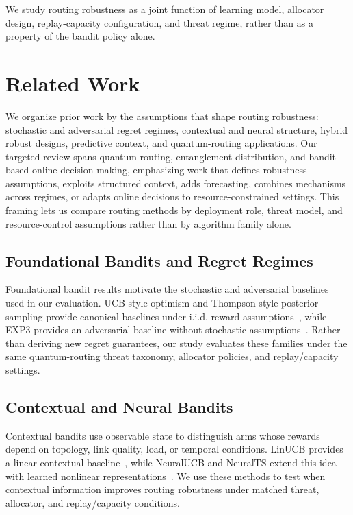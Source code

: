 \documentclass[10pt,conference]{IEEEtran}
\begin{document}
We study routing robustness as a joint function of learning model, allocator design, replay-capacity configuration, and threat regime, rather than as a property of the bandit policy alone.

\section{Related Work}
\label{sec:RelatedWork}

We organize prior work by the assumptions that shape routing robustness: stochastic and adversarial regret regimes, contextual and neural structure, hybrid robust designs, predictive context, and quantum-routing applications. Our targeted review spans quantum routing, entanglement distribution, and bandit-based online decision-making, emphasizing work that defines robustness assumptions, exploits structured context, adds forecasting, combines mechanisms across regimes, or adapts online decisions to resource-constrained settings. This framing lets us compare routing methods by deployment role, threat model, and resource-control assumptions rather than by algorithm family alone.

\subsection{Foundational Bandits and Regret Regimes}

Foundational bandit results motivate the stochastic and adversarial baselines used in our evaluation. UCB-style optimism and Thompson-style posterior sampling provide canonical baselines under i.i.d. reward assumptions~\cite{auer2002finite,thompson1933likelihood}, while EXP3 provides an adversarial baseline without stochastic assumptions~\cite{auer2002nonstochastic}. Rather than deriving new regret guarantees, our study evaluates these families under the same quantum-routing threat taxonomy, allocator policies, and replay/capacity settings.

\subsection{Contextual and Neural Bandits}

Contextual bandits use observable state to distinguish arms whose rewards depend on topology, link quality, load, or temporal conditions. LinUCB provides a linear contextual baseline~\cite{li2010contextual}, while NeuralUCB and NeuralTS extend this idea with learned nonlinear representations~\cite{zhou2020neuralucb,zhang2022neuralts}. We use these methods to test when contextual information improves routing robustness under matched threat, allocator, and replay/capacity conditions.
\end{document}
